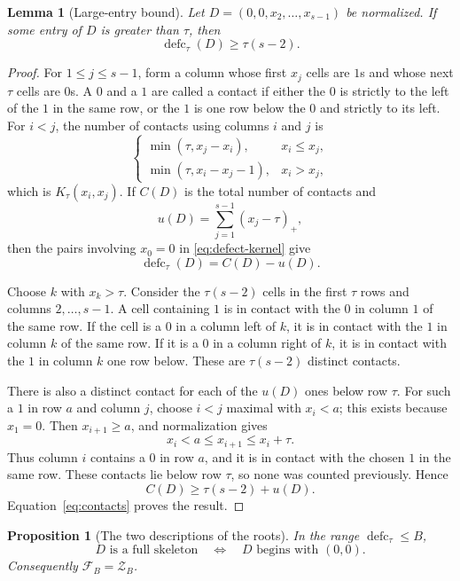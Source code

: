 \documentclass[11pt]{article}
\newtheorem{lemma}[theorem]{Lemma}
\newtheorem{proposition}[theorem]{Proposition}
\theoremstyle{definition}
\theoremstyle{remark}
\newcommand{\defc}{\operatorname{defc}}
\begin{document}
\begin{lemma}[Large-entry bound]
\label{lem:large-entry}
Let $D=(0,0,x_2,\ldots,x_{s-1})$ be normalized.  If some entry of $D$ is
greater than $\tau$, then
\[
  \defc_\tau(D)\ge\tau(s-2).
\]
\end{lemma}

\begin{proof}
For $1\le j\le s-1$, form a column whose first $x_j$ cells are $1$s and
whose next $\tau$ cells are $0$s.  A $0$ and a $1$ are called a contact if
either the $0$ is strictly to the left of the $1$ in the same row, or the
$1$ is one row below the $0$ and strictly to its left.  For $i<j$, the
number of contacts using columns $i$ and $j$ is
\[
 \begin{cases}
  \min(\tau,x_j-x_i),&x_i\le x_j,\\
  \min(\tau,x_i-x_j-1),&x_i>x_j,
 \end{cases}
\]
which is $K_\tau(x_i,x_j)$.  If $C(D)$ is the total number of contacts and
\[
  u(D)=\sum_{j=1}^{s-1}(x_j-\tau)_+,
\]
then the pairs involving $x_0=0$ in \eqref{eq:defect-kernel} give
\begin{equation}
  \defc_\tau(D)=C(D)-u(D).
  \label{eq:contacts}
\end{equation}

Choose $k$ with $x_k>\tau$.  Consider the $\tau(s-2)$ cells in the first
$\tau$ rows and columns $2,\ldots,s-1$.  A cell containing $1$ is in contact
with the $0$ in column $1$ of the same row.  If the cell is a $0$ in a
column left of $k$, it is in contact with the $1$ in column $k$ of the same
row.  If it is a $0$ in a column right of $k$, it is in contact with the $1$
in column $k$ one row below.  These are $\tau(s-2)$ distinct contacts.

There is also a distinct contact for each of the $u(D)$ ones below row
$\tau$.  For such a $1$ in row $a$ and column $j$, choose $i<j$ maximal
with $x_i<a$; this exists because $x_1=0$.  Then $x_{i+1}\ge a$, and
normalization gives
\[
  x_i<a\le x_{i+1}\le x_i+\tau.
\]
Thus column $i$ contains a $0$ in row $a$, and it is in contact with the
chosen $1$ in the same row.  These contacts lie below row $\tau$, so none
was counted previously.  Hence
\[
  C(D)\ge\tau(s-2)+u(D).
\]
Equation~\eqref{eq:contacts} proves the result.
\end{proof}

\begin{proposition}[The two descriptions of the roots]
\label{prop:full-zero}
In the range $\defc_\tau\le B$,
\[
  D\text{ is a full skeleton}
  \quad\Longleftrightarrow\quad
  D\text{ begins with }(0,0).
\]
Consequently $\mathcal F_B=\mathcal Z_B$.
\end{proposition}
\end{document}
